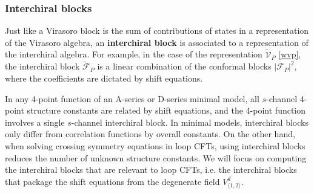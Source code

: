 \documentclass[12pt, a4paper]{article}
\newcommand{\myindex}[1]{\textbf{\boldmath #1}}
\theoremstyle{break}
\begin{document}
\subsubsection{Interchiral blocks}

Just like a Virasoro block is the sum of contributions of states in a representation of the Virasoro algebra, an \myindex{interchiral block} is associated to a representation of the interchiral algebra. For example, in the case of the representation $\widetilde{\mathcal{V}}_P$ \eqref{wvp}, the interchiral block $\widetilde{\mathcal{F}}_P$ is a linear combination of the conformal blocks $\left|\mathcal{F}_P\right|^2$, where the coefficients are dictated by shift equations. 

In any 4-point function of an A-series or D-series minimal model, all $s$-channel 4-point structure constants are related by shift equations, and the 4-point function involves a single $s$-channel interchiral block. In minimal models, interchiral blocks only differ from correlation functions by overall constants. On the other hand, when solving crossing symmetry equations in loop CFTs, using interchiral blocks reduces the number of unknown structure constants. We will focus on computing the interchiral blocks that are relevant to loop CFTs, i.e. the interchiral blocks that package the shift equations from the degenerate field $V^d_{\langle 1,2\rangle}$.  
\end{document}
